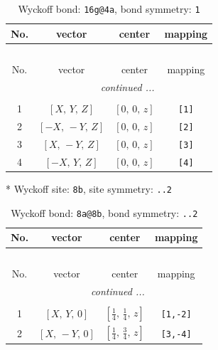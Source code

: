 \documentclass[fleqn,8pt]{jsarticle}
\begin{document}
\begin{longtable}{cccc}
\caption{Wyckoff bond: {\tt 16g@4a}, bond symmetry: {\tt 1}}
 \\
 \hline \hline
No. & vector & center & mapping \\ \hline \endfirsthead

\multicolumn{3}{l}{\tablename\ \thetable{}} \\
 \hline \hline
No. & vector & center & mapping \\ \hline \endhead

 \hline \hline
\multicolumn{3}{r}{\footnotesize\it continued ...} \\ \endfoot

 \hline \hline
\multicolumn{3}{r}{} \\ \endlastfoot

1 & $\left[ X,\, Y,\, Z \right]$ & $\left[ 0,\, 0,\, z \right]$ & {\tt [1]} \\ \hline
2 & $\left[ - X,\, - Y,\, Z \right]$ & $\left[ 0,\, 0,\, z \right]$ & {\tt [2]} \\ \hline
3 & $\left[ X,\, - Y,\, Z \right]$ & $\left[ 0,\, 0,\, z \right]$ & {\tt [3]} \\ \hline
4 & $\left[ - X,\, Y,\, Z \right]$ & $\left[ 0,\, 0,\, z \right]$ & {\tt [4]} \\
\end{longtable}
* Wyckoff site: {\tt 8b}, site symmetry: {\tt ..2}
\renewcommand{\arraystretch}{1.2}
\begin{longtable}{cccc}
\caption{Wyckoff bond: {\tt 8a@8b}, bond symmetry: {\tt ..2}}
 \\
 \hline \hline
No. & vector & center & mapping \\ \hline \endfirsthead

\multicolumn{3}{l}{\tablename\ \thetable{}} \\
 \hline \hline
No. & vector & center & mapping \\ \hline \endhead

 \hline \hline
\multicolumn{3}{r}{\footnotesize\it continued ...} \\ \endfoot

 \hline \hline
\multicolumn{3}{r}{} \\ \endlastfoot

1 & $\left[ X,\, Y,\, 0 \right]$ & $\left[ \frac{1}{4},\, \frac{1}{4},\, z \right]$ & {\tt [1,-2]} \\ \hline
2 & $\left[ X,\, - Y,\, 0 \right]$ & $\left[ \frac{1}{4},\, \frac{3}{4},\, z \right]$ & {\tt [3,-4]} \\
\end{longtable}
\end{document}
